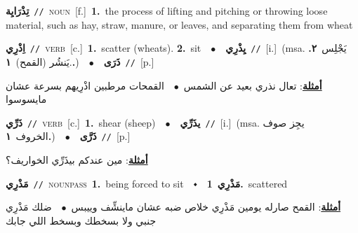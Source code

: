 \documentclass[10pt,a4paper,twoside]{article} %
\begin{document}
\begin{multicols}{2}
{{{\setlength\topsep{0pt}\textbf{\foreignlanguage{arabic}{تِذْرَايِة}}\ {\color{gray}\texttt{//}\color{black}}\ \textsc{noun}\ [f.]\ \textbf{1.}~the process of lifting and pitching or throwing loose material, such as hay, straw, manure, or leaves, and separating them from wheat\ 

{\setlength\topsep{0pt}\textbf{\foreignlanguage{arabic}{اِذْرِي}}\ {\color{gray}\texttt{//}\color{black}}\ \textsc{verb}\ [c.]\ \textbf{1.}~scatter (wheats).  \textbf{2.}~sit\ \ $\bullet$\ \ \setlength\topsep{0pt}\textbf{\foreignlanguage{arabic}{يِذْرِي}}\ {\color{gray}\texttt{//}\color{black}}\ [i.]\ \color{gray}(msa. \foreignlanguage{arabic}{يَجْلِس}~\foreignlanguage{arabic}{\textbf{٢.}}  .\foreignlanguage{arabic}{يَنشُر (القمح)}~\foreignlanguage{arabic}{\textbf{١.}})\color{black}\ \ $\bullet$\ \ \setlength\topsep{0pt}\textbf{\foreignlanguage{arabic}{ذَرَى}}\ {\color{gray}\texttt{//}\color{black}}\ [p.]\  \begin{flushright}\color{gray}\foreignlanguage{arabic}{\textbf{\underline{\foreignlanguage{arabic}{أمثلة}}}: تعال نذري بعيد عن الشمس\ $\bullet$\ \  القمحات مرطبين اذْرِيهم بسرعة عشان مايسوسوا}\end{flushright}\color{black}} \vspace{2mm}

{\setlength\topsep{0pt}\textbf{\foreignlanguage{arabic}{ذَرِّي}}\ {\color{gray}\texttt{//}\color{black}}\ \textsc{verb}\ [c.]\ \textbf{1.}~shear (sheep)\ \ $\bullet$\ \ \setlength\topsep{0pt}\textbf{\foreignlanguage{arabic}{يذَرِّي}}\ {\color{gray}\texttt{//}\color{black}}\ [i.]\ \color{gray}(msa. \foreignlanguage{arabic}{يجِز صوف الخروف}~\foreignlanguage{arabic}{\textbf{١.}})\color{black}\ \ $\bullet$\ \ \setlength\topsep{0pt}\textbf{\foreignlanguage{arabic}{ذَرَّى}}\ {\color{gray}\texttt{//}\color{black}}\ [p.]\  \begin{flushright}\color{gray}\foreignlanguage{arabic}{\textbf{\underline{\foreignlanguage{arabic}{أمثلة}}}: مين عندكم بيذَرِّي الخواريف؟}\end{flushright}\color{black}} \vspace{2mm}

{\setlength\topsep{0pt}\textbf{\foreignlanguage{arabic}{مَذْرِي}}\ {\color{gray}\texttt{//}\color{black}}\ \textsc{noun\textunderscore pass}\ \textbf{1.}~being forced to sit\ \ $\smblkdiamond$\ \ \setlength\topsep{0pt}\textbf{\foreignlanguage{arabic}{مَذْرِي}}\ \textbf{1.}~scattered\  \begin{flushright}\color{gray}\foreignlanguage{arabic}{\textbf{\underline{\foreignlanguage{arabic}{أمثلة}}}: القمح صارله يومين مَذْرِي خلاص ضبه عشان ماينشِّف وييبس\ $\bullet$\ \  ضلك مَذْرِي جنبي ولا بسخطك وبسخط اللي جابك}\end{flushright}\color{black}} \vspace{2mm}

}}}
\end{multicols}
\end{document}
